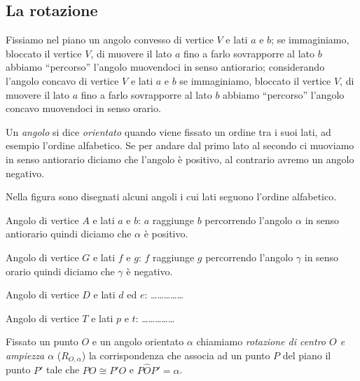 \subsection{La rotazione}

Fissiamo nel piano un angolo convesso di vertice $V$ e lati $a$ e $b$; se immaginiamo, bloccato il vertice $V$, di muovere il lato $a$ fino a farlo sovrapporre al lato $b$ abbiamo ``percorso'' l'angolo muovendoci in senso antiorario; considerando l'angolo concavo di vertice $V$ e lati $a$ e $b$ se immaginiamo, bloccato il vertice $V$, di muovere il lato $a$ fino a farlo sovrapporre al lato $b$ abbiamo ``percorso'' l'angolo concavo muovendoci in senso orario.

\begin{definizione}
Un \emph{angolo} si dice \emph{orientato} quando viene fissato un ordine tra i suoi lati, ad esempio l'ordine alfabetico. Se per andare dal primo lato al secondo ci muoviamo in senso antiorario diciamo che l'angolo è positivo, al contrario avremo un angolo negativo.
\end{definizione}

\begin{exrig}
\begin{esempio}
Nella figura sono disegnati alcuni angoli i cui lati seguono l'ordine alfabetico.
		
\begin{itemize*}
\item Angolo di vertice $A$ e lati $a$ e $b$: $a$ raggiunge $b$ percorrendo l'angolo $\alpha$ in senso antiorario quindi diciamo che $\alpha$ è positivo.
\item Angolo di vertice $G$ e lati $f$ e $g$: $f$ raggiunge $g$ percorrendo l'angolo $\gamma$ in senso orario quindi diciamo che $\gamma$ è negativo.
\item Angolo di vertice $D$ e lati $d$ ed $e$: \ldots\ldots\ldots\ldots\ldots{}
\item Angolo di vertice $T$ e lati $p$ e $t$: \ldots\ldots\ldots\ldots\ldots{}
\end{itemize*}
\end{esempio}
\end{exrig}
		
\begin{definizione}
Fissato un punto $O$ e un angolo orientato $\alpha$ chiamiamo \emph{rotazione di centro $O$ e ampiezza $\alpha$} ($R_{O,\alpha}$) la corrispondenza che associa ad un punto $P$ del piano il punto $P'$ tale che $PO\cong P'O$ e $P\widehat{O}P'=\alpha$.
\end{definizione}
		
